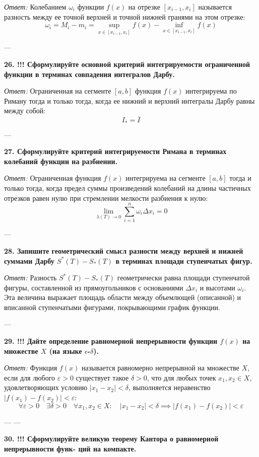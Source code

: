 \documentclass{article}
\begin{document}
\textit{Ответ:} Колебанием $\omega_i$ функции $f(x)$ на отрезке $[x_{i-1}, x_i]$ называется разность между ее точной верхней и точной нижней гранями на этом отрезке:
$$ \omega_i = M_i - m_i = \sup_{x \in [x_{i-1}, x_i]} f(x) - \inf_{x \in [x_{i-1}, x_i]} f(x) $$

---

\textbf{26. !!! Сформулируйте основной критерий интегрируемости ограниченной функции в терминах совпадения интегралов Дарбу.}

\textit{Ответ:} Ограниченная на сегменте $[a, b]$ функция $f(x)$ интегрируема по Риману тогда и только тогда, когда ее нижний и верхний интегралы Дарбу равны между собой:
$$ I_* = \overline{I} $$

---

\textbf{27. Сформулируйте критерий интегрируемости Римана в терминах колебаний функции на разбиении.}

\textit{Ответ:} Ограниченная функция $f(x)$ интегрируема на сегменте $[a, b]$ тогда и только тогда, когда предел суммы произведений колебаний на длины частичных отрезков равен нулю при стремлении мелкости разбиения к нулю:
$$ \lim_{\lambda(T) \to 0} \sum_{i=1}^n \omega_i \Delta x_i = 0 $$

---

\textbf{28. Запишите геометрический смысл разности между верхней и нижней суммами Дарбу $S^{*}(T)-S_{*}(T)$ в терминах площади ступенчатых фигур.}

\textit{Ответ:} Разность $S^*(T) - S_*(T)$ геометрически равна площади ступенчатой фигуры, составленной из прямоугольников с основаниями $\Delta x_i$ и высотами $\omega_i$. Эта величина выражает площадь области между объемлющей (описанной) и вписанной ступенчатыми фигурами, покрывающими график функции.

---

\textbf{29. !!! Дайте определение равномерной непрерывности функции $f(x)$ на множестве $X$ (на языке $\epsilon$-$\delta$).}

\textit{Ответ:} Функция $f(x)$ называется равномерно непрерывной на множестве $X$, если для любого $\varepsilon > 0$ существует такое $\delta > 0$, что для любых точек $x_1, x_2 \in X$, удовлетворяющих условию $|x_1 - x_2| < \delta$, выполняется неравенство $|f(x_1) - f(x_2)| < \varepsilon$:
$$ \forall \varepsilon > 0 \quad \exists \delta > 0 \quad \forall x_1, x_2 \in X : \quad |x_1 - x_2| < \delta \implies |f(x_1) - f(x_2)| < \varepsilon $$

---
---

\textbf{30. !!! Сформулируйте великую теорему Кантора о равномерной непрерывности функ- ций на компакте.}
\end{document}
